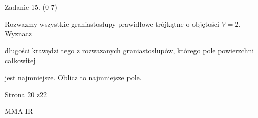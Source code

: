 \documentclass[a4paper,12pt]{article}
\begin{document}
Zadanie 15. (0-7)

Rozwazmy wszystkie graniastosłupy prawidłowe trójkątne o objętości $V=2$. Wyznacz

długości krawędzi tego z rozwazanych graniastosłupów, którego pole powierzchni całkowitej

jest najmniejsze. Oblicz to najmniejsze pole.

Strona 20 z22

MMA-IR
\end{document}
